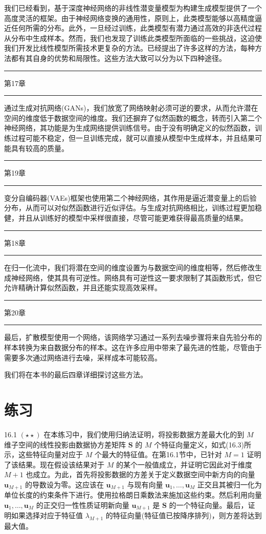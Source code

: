\documentclass[10pt]{report}
\newcommand{\HRule}{\begin{center}\rule{0.9\linewidth}{0.2mm}\end{center}}
\begin{document}
我们已经看到，基于深度神经网络的非线性潜变量模型为构建生成模型提供了一个高度灵活的框架。由于神经网络变换的通用性，原则上，此类模型能够以高精度逼近任何所需的分布。此外，一旦经过训练，此类模型有潜力通过高效的非迭代过程从分布中生成样本。然而，我们也发现了训练此类模型所面临的一些挑战，这迫使我们开发比线性模型所需技术更复杂的方法。已经提出了许多这样的方法，每种方法都有其自身的优势和局限性。这些方法大致可以分为以下四种途径。

\HRule

第17章

\HRule

通过生成对抗网络(GANs)，我们放宽了网络映射必须可逆的要求，从而允许潜在空间的维度低于数据空间的维度。我们还摒弃了似然函数的概念，转而引入第二个神经网络，其功能是为生成网络提供训练信号。由于没有明确定义的似然函数，训练过程可能不稳定，但一旦训练完成，就可以直接从模型中生成样本，并且结果可能具有较高的质量。

\HRule

第19章

\HRule

变分自编码器(VAEs)框架也使用第二个神经网络，其作用是逼近潜变量上的后验分布，从而可以对似然函数进行近似评估。与生成对抗网络相比，训练过程更加稳健，并且从训练好的模型中采样很直接，尽管可能更难获得最高质量的结果。

\HRule

第18章

\HRule

在归一化流中，我们将潜在空间的维度设置为与数据空间的维度相等，然后修改生成神经网络，使其具有可逆性。网络具有可逆性这一要求限制了其函数形式，但它允许精确计算似然函数，并且还能实现高效采样。

\HRule

第20章

\HRule

最后，扩散模型使用一个网络，该网络学习通过一系列去噪步骤将来自先验分布的样本转换为来自数据分布的样本。这在许多应用中带来了最先进的性能，尽管由于需要多次通过网络进行去噪，采样成本可能较高。

我们将在本书的最后四章详细探讨这些方法。

\section*{练习}

16.1 \(\left( {\star  \star  }\right)\) 在本练习中，我们使用归纳法证明，将投影数据方差最大化的到 \(M\) 维子空间的线性投影由数据协方差矩阵 \(\mathbf{S}\) 的 \(M\) 个特征向量定义，如式(16.3)所示，这些特征向量对应于 \(M\) 个最大的特征值。在第16.1节中，已针对 \(M = 1\) 证明了该结果。现在假设该结果对于 \(M\) 的某个一般值成立，并证明它因此对于维度 \(M + 1\) 也成立。为此，首先将投影数据的方差关于定义数据空间中新方向的向量 \({\mathbf{u}}_{M + 1}\) 的导数设为零。这应该在 \({\mathbf{u}}_{M + 1}\) 与现有向量 \({\mathbf{u}}_{1},\ldots ,{\mathbf{u}}_{M}\) 正交且其被归一化为单位长度的约束条件下进行。使用拉格朗日乘数法来施加这些约束。然后利用向量 \({\mathbf{u}}_{1},\ldots ,{\mathbf{u}}_{M}\) 的正交归一性性质证明新向量 \({\mathbf{u}}_{M + 1}\) 是 \(\mathbf{S}\) 的一个特征向量。最后，证明如果选择对应于特征值 \({\lambda }_{M + 1}\) 的特征向量(特征值已按降序排列)，则方差将达到最大值。
\end{document}
